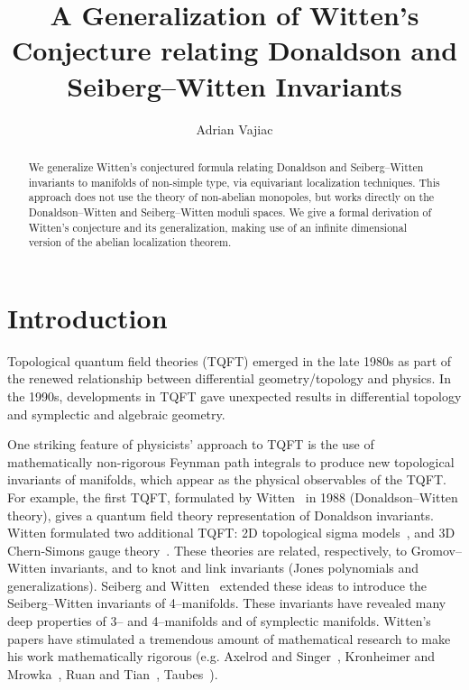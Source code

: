 \documentclass[a4paper,12pt,reqno,sumlimits]{amsart}
\theoremstyle{plain}
\theoremstyle{definition}
\providecommand{\1}{{\bf 1}}
\numberwithin{equation}{section}
\begin{document}
\title[A Generalization of Witten's Conjecture]{A Generalization of Witten's
  Conjecture relating Donaldson and Seiberg--Witten Invariants}
\author{Adrian Vajiac}
\address{Department of Mathematics\\
  University of Texas at Austin}
\begin{abstract}
  We generalize Witten's conjectured formula relating Donaldson and
  Seiberg--Witten invariants to manifolds of non-simple type, via equivariant
  localization techniques. This approach does not use the theory of
  non-abelian monopoles, but works directly on the Donaldson--Witten and
  Seiberg--Witten moduli spaces.  We give a formal derivation of Witten's
  conjecture and its generalization, making use of an infinite dimensional
  version of the abelian localization theorem.
\end{abstract}


\maketitle



\section{Introduction}
\label{intro}

Topological quantum field theories (TQFT) emerged in the late 1980s as part
of the renewed relationship between differential geometry/topology and
physics.  In the 1990s, developments in TQFT gave unexpected results in
differential topology and symplectic and algebraic geometry.

One striking feature of physicists' approach to TQFT is the use of
mathematically non-rigorous Feynman path integrals to produce new topological
invariants of manifolds, which appear as the physical observables of the
TQFT.  For example, the first TQFT, formulated by Witten~\cite{ewdon} in 1988
(Donaldson--Witten theory), gives a quantum field theory representation of
Donaldson invariants.  Witten formulated two additional TQFT: 2D topological
sigma models~\cite{ewsig}, and 3D Chern-Simons gauge theory~\cite{ewdon}.
These theories are related, respectively, to Gromov--Witten invariants, and
to knot and link invariants (Jones polynomials and generalizations).  Seiberg
and Witten~\cite{nsew} extended these ideas to introduce the Seiberg--Witten
invariants of 4--manifolds. These invariants have revealed many deep
properties of 3-- and 4--manifolds and of symplectic manifolds.  Witten's
papers have stimulated a tremendous amount of mathematical research to make
his work mathematically rigorous (e.g. Axelrod and Singer~\cite{axsinger},
Kronheimer and Mrowka~\cite{km1}, Ruan and Tian~\cite{ruantian},
Taubes~\cite{taubes}).
\end{document}
